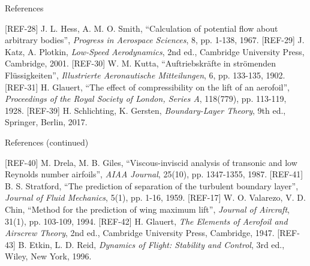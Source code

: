 \documentclass[aspectratio=169,11pt]{beamer}
\begin{document}
\begin{frame}{References}
\begin{reflist}
   
   \recordsref
   [REF-28] J. L. Hess, A. M. O. Smith, ``Calculation of potential flow about
        arbitrary bodies'', \emph{Progress in Aerospace Sciences}, 8,
        pp. 1-138, 1967.
   [REF-29] J. Katz, A. Plotkin, \emph{Low-Speed Aerodynamics}, 2nd ed.,
        Cambridge University Press, Cambridge, 2001.
   [REF-30] W. M. Kutta, ``Auftriebskr\"afte in str\"omenden Fl\"ussigkeiten'',
        \emph{Illustrierte Aeronautische Mitteilungen}, 6, pp. 133-135, 1902.
   [REF-31] H. Glauert, ``The effect of compressibility on the lift of an
        aerofoil'', \emph{Proceedings of the Royal Society of London, Series
        A}, 118(779), pp. 113-119, 1928.
   [REF-39] H. Schlichting, K. Gersten, \emph{Boundary-Layer Theory}, 9th ed.,
        Springer, Berlin, 2017.
\end{reflist}
\end{frame}

\begin{frame}{References (continued)}
\begin{reflist}
  \setcounter{enumi}{7}
   [REF-40] M. Drela, M. B. Giles, ``Viscous-inviscid analysis of transonic and
        low Reynolds number airfoils'', \emph{AIAA Journal}, 25(10),
        pp. 1347-1355, 1987.
   [REF-41] B. S. Stratford, ``The prediction of separation of the turbulent
        boundary layer'', \emph{Journal of Fluid Mechanics}, 5(1), pp. 1-16,
        1959.
   [REF-17] W. O. Valarezo, V. D. Chin, ``Method for the prediction of wing
        maximum lift'', \emph{Journal of Aircraft}, 31(1), pp. 103-109, 1994.
   [REF-42] H. Glauert, \emph{The Elements of Aerofoil and Airscrew Theory}, 2nd
        ed., Cambridge University Press, Cambridge, 1947.
   [REF-43] B. Etkin, L. D. Reid, \emph{Dynamics of Flight: Stability and
        Control}, 3rd ed., Wiley, New York, 1996.
\end{reflist}
\end{frame}
\end{document}
